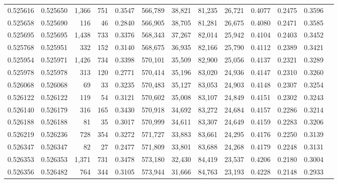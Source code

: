 \begin{tabular}{rrrrrrrrrrrrr}
0.525616 & 0.525650 & 1,366 &   751 &                                     0.3547 & 566,789 &  38,821 &  81,235 &  26,721 & 0.4077 & 0.2475 & 0.3596 \\
0.525658 & 0.525690 &   116 &    46 &                                     0.2840 & 566,905 &  38,705 &  81,281 &  26,675 & 0.4080 & 0.2471 & 0.3585 \\
0.525695 & 0.525695 & 1,438 &   733 &                                     0.3376 & 568,343 &  37,267 &  82,014 &  25,942 & 0.4104 & 0.2403 & 0.3452 \\
0.525768 & 0.525951 &   332 &   152 &                                     0.3140 & 568,675 &  36,935 &  82,166 &  25,790 & 0.4112 & 0.2389 & 0.3421 \\
0.525954 & 0.525971 & 1,426 &   734 &                                     0.3398 & 570,101 &  35,509 &  82,900 &  25,056 & 0.4137 & 0.2321 & 0.3289 \\
0.525978 & 0.525978 &   313 &   120 &                                     0.2771 & 570,414 &  35,196 &  83,020 &  24,936 & 0.4147 & 0.2310 & 0.3260 \\
0.526068 & 0.526068 &    69 &    33 &                                     0.3235 & 570,483 &  35,127 &  83,053 &  24,903 & 0.4148 & 0.2307 & 0.3254 \\
0.526122 & 0.526122 &   119 &    54 &                                     0.3121 & 570,602 &  35,008 &  83,107 &  24,849 & 0.4151 & 0.2302 & 0.3243 \\
0.526140 & 0.526179 &   316 &   165 &                                     0.3430 & 570,918 &  34,692 &  83,272 &  24,684 & 0.4157 & 0.2286 & 0.3214 \\
0.526188 & 0.526188 &    81 &    35 &                                     0.3017 & 570,999 &  34,611 &  83,307 &  24,649 & 0.4159 & 0.2283 & 0.3206 \\
0.526219 & 0.526236 &   728 &   354 &                                     0.3272 & 571,727 &  33,883 &  83,661 &  24,295 & 0.4176 & 0.2250 & 0.3139 \\
0.526347 & 0.526347 &    82 &    27 &                                     0.2477 & 571,809 &  33,801 &  83,688 &  24,268 & 0.4179 & 0.2248 & 0.3131 \\
0.526353 & 0.526353 & 1,371 &   731 &                                     0.3478 & 573,180 &  32,430 &  84,419 &  23,537 & 0.4206 & 0.2180 & 0.3004 \\
0.526356 & 0.526482 &   764 &   344 &                                     0.3105 & 573,944 &  31,666 &  84,763 &  23,193 & 0.4228 & 0.2148 & 0.2933 \\

\end{tabular}
